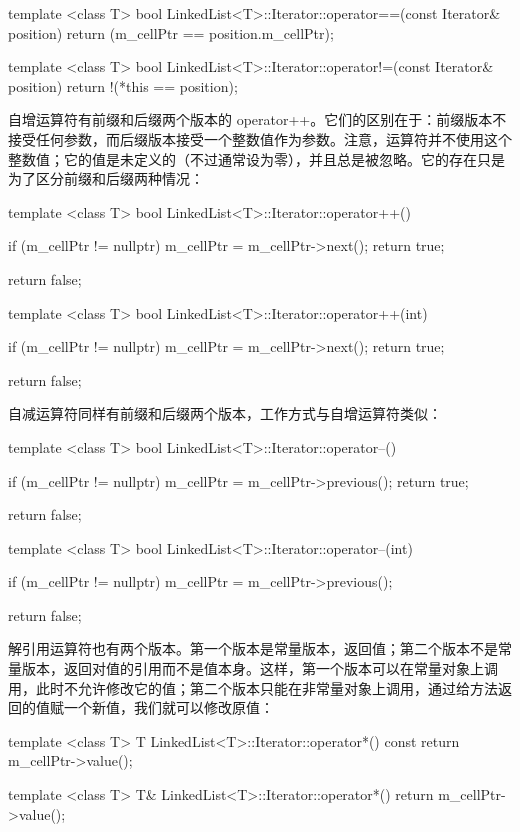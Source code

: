 \begin{codebox}
template <class T>
bool LinkedList<T>::Iterator::operator==(const Iterator& position) {
  return (m_cellPtr == position.m_cellPtr);
}

template <class T>
bool LinkedList<T>::Iterator::operator!=(const Iterator& position) {
  return !(*this == position);
}
\end{codebox}

自增运算符有前缀和后缀两个版本的 operator++。它们的区别在于：前缀版本不接受任何参数，而后缀版本接受一个整数值作为参数。注意，运算符并不使用这个整数值；它的值是未定义的（不过通常设为零），并且总是被忽略。它的存在只是为了区分前缀和后缀两种情况：

\begin{codebox}
template <class T>
bool LinkedList<T>::Iterator::operator++() {
  if (m_cellPtr != nullptr) {
    m_cellPtr = m_cellPtr->next();
    return true;
  }

  return false;
}

template <class T>
bool LinkedList<T>::Iterator::operator++(int) {
  if (m_cellPtr != nullptr) {
    m_cellPtr = m_cellPtr->next();
    return true;
  }

  return false;
}
\end{codebox}

自减运算符同样有前缀和后缀两个版本，工作方式与自增运算符类似：

\begin{codebox}
template <class T>
bool LinkedList<T>::Iterator::operator--() {
  if (m_cellPtr != nullptr) {
    m_cellPtr = m_cellPtr->previous();
    return true;
  }

  return false;
}

template <class T>
bool LinkedList<T>::Iterator::operator--(int) {
  if (m_cellPtr != nullptr) {
    m_cellPtr = m_cellPtr->previous();
  }

  return false;
}
\end{codebox}

解引用运算符也有两个版本。第一个版本是常量版本，返回值；第二个版本不是常量版本，返回对值的引用而不是值本身。这样，第一个版本可以在常量对象上调用，此时不允许修改它的值；第二个版本只能在非常量对象上调用，通过给方法返回的值赋一个新值，我们就可以修改原值：

\begin{codebox}
template <class T>
T LinkedList<T>::Iterator::operator*() const {
  return m_cellPtr->value();
}

template <class T>
T& LinkedList<T>::Iterator::operator*() {
  return m_cellPtr->value();
}
\end{codebox}

